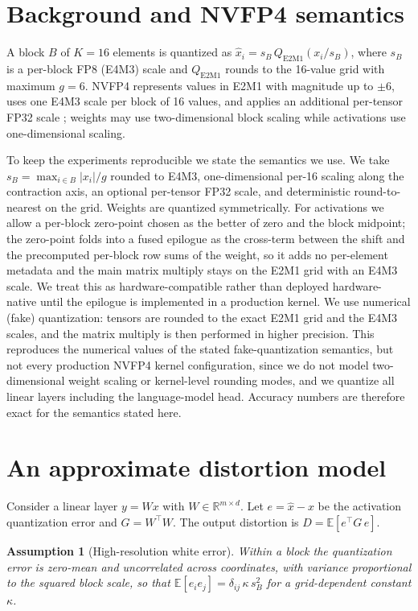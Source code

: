 \documentclass[11pt]{article}
\newtheorem{assumption}{Assumption}
\newcommand{\E}{\mathbb{E}}
\begin{document}
\section{Background and NVFP4 semantics}\label{sec:bg}
A block $B$ of $K=16$ elements is quantized as
$\hat{x}_i = s_B \, Q_{\text{E2M1}}(x_i / s_B)$, where $s_B$ is a per-block FP8 (E4M3)
scale and $Q_{\text{E2M1}}$ rounds to the 16-value grid with maximum $g=6$. NVFP4
represents values in E2M1 with magnitude up to $\pm 6$, uses one E4M3 scale per block of
16 values, and applies an additional per-tensor FP32 scale \cite{nvidia_nvfp4_te};
weights may use two-dimensional block scaling while activations use one-dimensional
scaling.

To keep the experiments reproducible we state the semantics we use. We take
$s_B=\max_{i\in B}|x_i|/g$ rounded to E4M3, one-dimensional per-16 scaling along the
contraction axis, an optional per-tensor FP32 scale, and deterministic round-to-nearest
on the grid. Weights are quantized symmetrically. For activations we allow a per-block
zero-point chosen as the better of zero and the block midpoint; the zero-point folds
into a fused epilogue as the cross-term between the shift and the precomputed per-block
row sums of the weight, so it adds no per-element metadata and the main matrix multiply
stays on the E2M1 grid with an E4M3 scale. We treat this as hardware-compatible rather
than deployed hardware-native until the epilogue is implemented in a production kernel. We use numerical (fake) quantization: tensors
are rounded to the exact E2M1 grid and the E4M3 scales, and the matrix multiply is then
performed in higher precision. This reproduces the numerical values of the stated
fake-quantization semantics, but not every production NVFP4 kernel configuration, since
we do not model two-dimensional weight scaling or kernel-level rounding modes, and we
quantize all linear layers including the language-model head. Accuracy numbers are
therefore exact for the semantics stated here.

\section{An approximate distortion model}\label{sec:theory}
Consider a linear layer $y = Wx$ with $W \in \mathbb{R}^{m\times d}$. Let
$e = \hat{x} - x$ be the activation quantization error and $G = W^\top W$. The output
distortion is $D = \E[e^\top G\, e]$.

\begin{assumption}[High-resolution white error]\label{a:white}
Within a block the quantization error is zero-mean and uncorrelated across coordinates,
with variance proportional to the squared block scale, so that
$\E[e_i e_j] = \delta_{ij}\,\kappa\, s_B^2$ for a grid-dependent constant $\kappa$.
\end{assumption}
\end{document}
